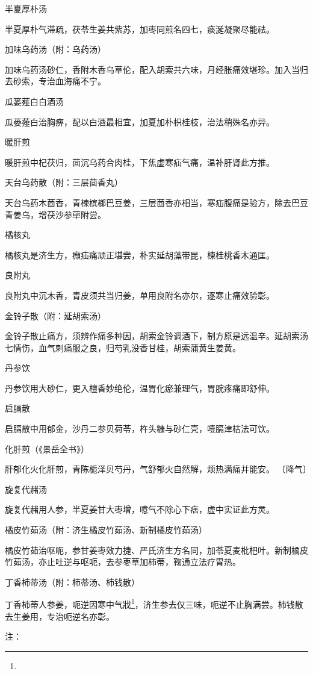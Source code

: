\documentclass[a4paper,12pt,UTF8,twoside]{ctexbook}
\begin{document}
半夏厚朴汤

半夏厚朴气滞疏，茯苓生姜共紫苏，加枣同煎名四七，痰涎凝聚尽能祛。

加味乌药汤（附：乌药汤）

加味乌药汤砂仁，香附木香乌草伦，配入胡索共六味，月经胀痛效堪珍。加入当归去砂索，专治血海痛不宁。

瓜蒌薤白白酒汤

瓜蒌薤白治胸痹，配以白酒最相宜，加夏加朴枳桂枝，治法稍殊名亦异。

暖肝煎

暖肝煎中杞茯归，茴沉乌药合肉桂，下焦虚寒疝气痛，温补肝肾此方推。

天台乌药散（附：三层茴香丸）

天台乌药木茴香，青楝槟榔巴豆姜，三层茴香亦相当，寒疝腹痛是验方，除去巴豆青姜乌，增茯沙参荜附尝。

橘核丸

橘核丸是济生方，㿗疝痛顽正堪尝，朴实延胡藻带昆，楝桂桃香木通匡。

良附丸

良附丸中沉木香，青皮须共当归姜，单用良附名亦尔，逐寒止痛效验彰。

金铃子散（附：延胡索汤）

金铃子散止痛方，须辨作痛多种因，胡索金铃调酒下，制方原是远温辛。延胡索汤七情伤，血气刺痛服之良，归芍乳没香甘桂，胡索蒲黄生姜黄。

丹参饮

丹参饮用大砂仁，更入檀香妙绝伦，温胃化瘀兼理气，胃脘疼痛即舒伸。

启膈散

启膈散中用郁金，沙丹二参贝荷苓，杵头糠与砂仁壳，噎膈津枯法可饮。

化肝煎（《景岳全书》）

肝郁化火化肝煎，青陈栀泽贝芍丹，气舒郁火自然解，烦热满痛并能安。
〔降气〕

旋复代赭汤

旋复代赭用人参，半夏姜甘大枣增，噫气不除心下痞，虚中实证此方灵。

橘皮竹茹汤（附：济生橘皮竹茹汤、新制橘皮竹茹汤）

橘皮竹茹治呕呃，参甘姜枣效力捷、严氏济生方名同，加苓夏麦枇杷叶。新制橘皮竹茹汤，亦止吐逆与呕呃，去参枣草加柿蒂，鞠通立法疗胃热。

丁香柿蒂汤（附：柿蒂汤、柿钱散）

丁香柿蒂人参姜，呃逆因寒中气戕\footnote{}，济生参去仅三味，呃逆不止胸满尝。柿钱散去生姜用，专治呃逆名亦彰。

注：
\end{document}
